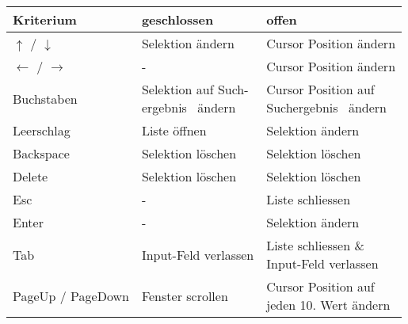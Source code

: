 \begin{table}[!htb] 
    \label{table:interactionNewComponent}
    \footnotesize
    \begin{adjustbox}{max width=\textwidth}
        \begin{threeparttable}
            \begin{tabular}{ l || l | l }
                \bf{Kriterium}    & \bf{geschlossen} & \bf{offen} \\
                \hline \hline
                $\uparrow$ / $\downarrow$    & Selektion ändern & Cursor Position ändern                 \\
                \hline
                $\leftarrow$ / $\rightarrow$ & -                & Cursor Position ändern                 \\
                \hline
                Buchstaben  & \tbbr{Selektion auf Such-\\ 
                                    ergebnis\tnote{1} \ ändern} & \tbbr{Cursor Position auf \\ 
                                                                        Suchergebnis\tnote{1} \ ändern}  \\
                \hline
                Leerschlag  & Liste öffnen                & Selektion ändern  \\
                \hline
                Backspace   & Selektion löschen           & Selektion löschen \\
                \hline
                Delete      & Selektion löschen           & Selektion löschen \\
                \hline
                Esc         & -                           & Liste schliessen  \\
                \hline \hline
                Enter       & -                           & Selektion ändern  \\
                \hline
                Tab         & Input-Feld verlassen        & \tbbr{Liste schliessen \& \\ 
                                                                  Input-Feld verlassen}                  \\
                \hline
                PageUp / PageDown & Fenster scrollen      & \tbbr{Cursor Position auf \\ 
                                                                  jeden 10. Wert ändern}                 \\

\end{tabular}
\end{threeparttable}
\end{adjustbox}
\end{table}
